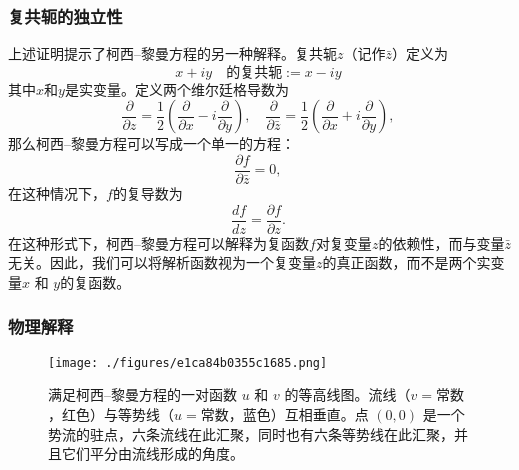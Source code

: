 \subsubsection{复共轭的独立性}  
上述证明提示了柯西–黎曼方程的另一种解释。复共轭\( z \)（记作\( \bar{z} \)）定义为  
\[
x + iy \quad \text{的复共轭} := x - iy~
\]
其中\( x \)和\( y \)是实变量。定义两个维尔廷格导数为  
\[
\frac{\partial}{\partial z} = \frac{1}{2} \left( \frac{\partial}{\partial x} - i \frac{\partial}{\partial y} \right), \quad \frac{\partial}{\partial \bar{z}} = \frac{1}{2} \left( \frac{\partial}{\partial x} + i \frac{\partial}{\partial y} \right),~
\]
那么柯西–黎曼方程可以写成一个单一的方程：  
\[
\frac{\partial f}{\partial \bar{z}} = 0,~
\]
在这种情况下，\( f \)的复导数为  
\[
\frac{df}{dz} = \frac{\partial f}{\partial z}.~
\]
在这种形式下，柯西–黎曼方程可以解释为复函数\( f \)对复变量\( z \)的依赖性，而与变量\( \bar{z} \)无关。因此，我们可以将解析函数视为一个复变量\( z \)的真正函数，而不是两个实变量\( x \) 和 \( y \)的复函数。
\subsubsection{物理解释}
\begin{figure}[ht]
\centering
\texttt{[image: ./figures/e1ca84b0355c1685.png]}
\caption{满足柯西–黎曼方程的一对函数 \( u \) 和 \( v \) 的等高线图。流线（\( v = \text{常数} \)，红色）与等势线（\( u = \text{常数} \)，蓝色）互相垂直。点 \( (0, 0) \) 是一个势流的驻点，六条流线在此汇聚，同时也有六条等势线在此汇聚，并且它们平分由流线形成的角度。} \label{fig_KExiLM_2}
\end{figure}